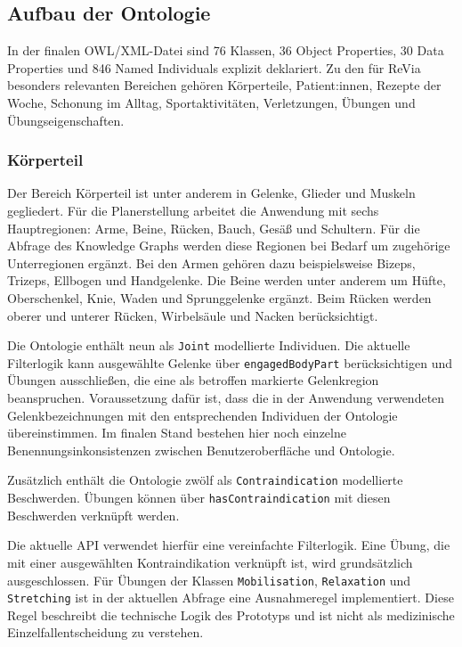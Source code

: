 \subsection{Aufbau der Ontologie}

In der finalen OWL/XML-Datei sind 76 Klassen, 36 Object Properties, 30 Data Properties und 846 Named Individuals explizit deklariert. Zu den für ReVia besonders relevanten Bereichen gehören Körperteile, Patient:innen, Rezepte der Woche, Schonung im Alltag, Sportaktivitäten, Verletzungen, Übungen und Übungseigenschaften.


\subsubsection{Körperteil}

Der Bereich Körperteil ist unter anderem in Gelenke, Glieder und Muskeln gegliedert. Für die Planerstellung arbeitet die Anwendung mit sechs Hauptregionen: Arme, Beine, Rücken, Bauch, Gesäß und Schultern. Für die Abfrage des Knowledge Graphs werden diese Regionen bei Bedarf um zugehörige Unterregionen ergänzt. Bei den Armen gehören dazu beispielsweise Bizeps, Trizeps, Ellbogen und Handgelenke. Die Beine werden unter anderem um Hüfte, Oberschenkel, Knie, Waden und Sprunggelenke ergänzt. Beim Rücken werden oberer und unterer Rücken, Wirbelsäule und Nacken berücksichtigt.

Die Ontologie enthält neun als \texttt{Joint} modellierte Individuen. Die aktuelle Filterlogik kann ausgewählte Gelenke über \texttt{engagedBodyPart} berücksichtigen und Übungen ausschließen, die eine als betroffen markierte Gelenkregion beanspruchen. Voraussetzung dafür ist, dass die in der Anwendung verwendeten Gelenkbezeichnungen mit den entsprechenden Individuen der Ontologie übereinstimmen. Im finalen Stand bestehen hier noch einzelne Benennungsinkonsistenzen zwischen Benutzeroberfläche und Ontologie.


Zusätzlich enthält die Ontologie zwölf als \texttt{Contraindication} modellierte Beschwerden. Übungen können über \texttt{hasContraindication} mit diesen Beschwerden verknüpft werden.

Die aktuelle API verwendet hierfür eine vereinfachte Filterlogik. Eine Übung, die mit einer ausgewählten Kontraindikation verknüpft ist, wird grundsätzlich ausgeschlossen. Für Übungen der Klassen \texttt{Mobilisation}, \texttt{Relaxation} und \texttt{Stretching} ist in der aktuellen Abfrage eine Ausnahmeregel implementiert. Diese Regel beschreibt die technische Logik des Prototyps und ist nicht als medizinische Einzelfallentscheidung zu verstehen.


